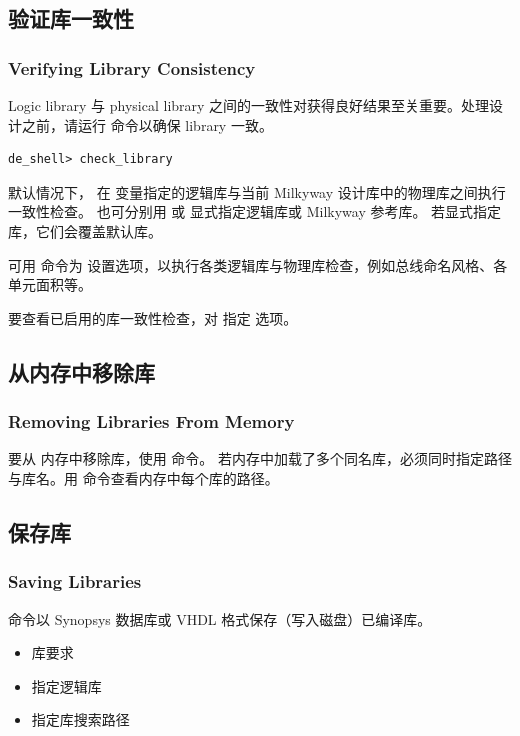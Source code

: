 \subsection{验证库一致性}
\subsubsection*{Verifying Library Consistency}

Logic library 与 physical library 之间的一致性对获得良好结果至关重要。处理设计之前，请运行  命令以确保 library 一致。
\begin{lstlisting}
de_shell> check_library
\end{lstlisting}

默认情况下， 在  变量指定的逻辑库与当前 Milkyway 设计库中的物理库之间执行一致性检查。
也可分别用  或  显式指定逻辑库或 Milkyway 参考库。
若显式指定库，它们会覆盖默认库。

可用  命令为  设置选项，以执行各类逻辑库与物理库检查，例如总线命名风格、各单元面积等。

要查看已启用的库一致性检查，对  指定  选项。

\subsection{从内存中移除库}
\subsubsection*{Removing Libraries From Memory}

要从  内存中移除库，使用  命令。
若内存中加载了多个同名库，必须同时指定路径与库名。用  命令查看内存中每个库的路径。

\subsection{保存库}
\subsubsection*{Saving Libraries}

 命令以 Synopsys 数据库或 VHDL 格式保存（写入磁盘）已编译库。

\begin{seeAlsoBox}
\begin{itemize}
  \item 库要求
  \item 指定逻辑库
  \item 指定库搜索路径
\end{itemize}
\end{seeAlsoBox}

